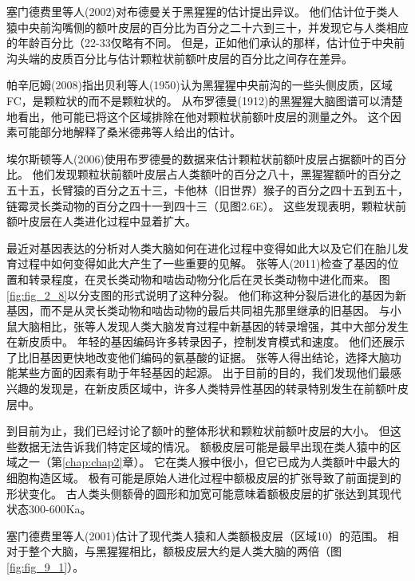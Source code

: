 塞门德费里等人(2002)对布德曼关于黑猩猩的估计提出异议。
他们估计位于类人猿中央前沟嘴侧的额叶皮层的百分比为百分之二十六到三十，并发现它与人类相应的年龄百分比（22-33仅略有不同。
但是，正如他们承认的那样，估计位于中央前沟头端的皮质百分比与估计颗粒状前额叶皮层的百分比之间存在差异。
\par


帕辛厄姆(2008)指出贝利等人(1950)认为黑猩猩中央前沟的一些头侧皮质，区域FC，是颗粒状的而不是颗粒状的。
从布罗德曼(1912)的黑猩猩大脑图谱可以清楚地看出，他可能已将这个区域排除在他对颗粒状前额叶皮层的测量之外。
这个因素可能部分地解释了桑米德弗等人给出的估计。
\par


埃尔斯顿等人(2006)使用布罗德曼的数据来估计颗粒状前额叶皮层占据额叶的百分比。
他们发现颗粒状前额叶皮层占人类额叶的百分之八十，黑猩猩额叶的百分之五十五，长臂猿的百分之五十三，卡他林（旧世界）猴子的百分之四十五到五十，链霉灵长类动物的百分之四十一到四十三（见图2.6E）。
这些发现表明，颗粒状前额叶皮层在人类进化过程中显着扩大。
\par


最近对基因表达的分析对人类大脑如何在进化过程中变得如此大以及它们在胎儿发育过程中如何变得如此大产生了一些重要的见解。
张等人(2011)检查了基因的位置和转录程度，在灵长类动物和啮齿动物分化后在灵长类动物中进化而来。
图\ref{fig:fig_2_8}以分支图的形式说明了这种分裂。
他们称这种分裂后进化的基因为新基因，而不是从灵长类动物和啮齿动物的最后共同祖先那里继承的旧基因。
与小鼠大脑相比，张等人发现人类大脑发育过程中新基因的转录增强，其中大部分发生在新皮质中。
年轻的基因编码许多转录因子，控制发育模式和速度。
他们还展示了比旧基因更快地改变他们编码的氨基酸的证据。
张等人得出结论，选择大脑功能某些方面的因素有助于年轻基因的起源。
出于目前的目的，我们发现他们最感兴趣的发现是，在新皮质区域中，许多人类特异性基因的转录特别发生在前额叶皮层中。
\par


到目前为止，我们已经讨论了额叶的整体形状和颗粒状前额叶皮层的大小。
但这些数据无法告诉我们特定区域的情况。
额极皮层可能是最早出现在类人猿中的区域之一（第\ref{chap:chap2}章）。
它在类人猴中很小，但它已成为人类额叶中最大的细胞构造区域。
极有可能是原始人进化过程中额极皮层的扩张导致了前面提到的形状变化。
古人类头侧额骨的圆形和加宽可能意味着额极皮层的扩张达到其现代状态300-600Ka。
\par


塞门德费里等人(2001)估计了现代类人猿和人类额极皮层（区域10）的范围。
相对于整个大脑，与黑猩猩相比，额极皮层大约是人类大脑的两倍（图\ref{fig:fig_9_1}）。
\par


